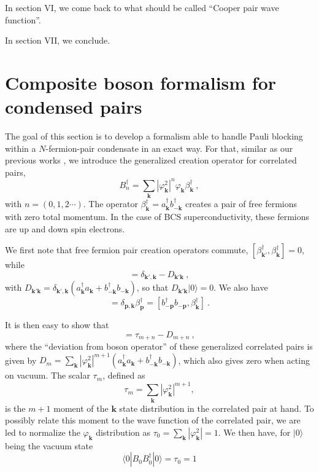 \documentclass[twocolumn,showpacs]{revtex4}
\def\v#1{\mathbf{#1}}
\begin{document}
In section VI, we come back to what should be called ``Cooper pair wave function''.

In section VII, we conclude.

\section{Composite boson formalism for condensed pairs}

The goal of this section is to develop a formalism able to handle Pauli blocking within a $N$-fermion-pair condensate in an exact way. For that, similar as our previous works \cite{CobosonPhysicsReports, combescotBCS, CobosonBcsRich,motheaten}, we introduce the generalized creation operator for correlated pairs,
\begin{equation}
B_n^\dag=\sum_{\v k}|\varphi_{\v k}^2|^n\varphi_{\v k}\beta_{\v k}^\dag\ ,
\end{equation}
with $n=(0,1,2\cdots)$. The operator $\beta_{\v k}^\dag=a_{\v k}^\dag b_{-\v k}^\dag$ creates a pair of free fermions with zero total momentum. In the case of BCS superconductivity, these fermions are up and down spin electrons.

We first note that free fermion pair creation operators commute, $[\beta_{\v k'}^\dag,\beta_{\v k}^\dag]=0$, while
\begin{equation}
[\beta_{\v k'},\beta_{\v k}^\dag]=\delta_{\v k',\v k}-D_{\v k'\v k}\ ,
\end{equation}
with $D_{\v k'\v k}=\delta_{\v k',\v k}(a_{\v k}^\dag a_{\v k}+b_{-\v k}^\dag b_{-\v k})$, so that $D_{\v k'\v k}|0\rangle=0$. We also have
\begin{equation}
[a_{\v p}^\dag a_{\v p},\beta_{\v k}^\dag]=\delta_{\v p,\v k}\beta_{\v p}^\dag=[b_{-\v p}^\dag b_{-\v p},
\beta_{\v k}^\dag]\ .
\end{equation}

It is then easy to show that
\begin{equation}
[B_m,B_n^\dag]=\tau_{m+n}-D_{m+n}\ ,
\end{equation}
where the ``deviation from boson operator'' of these generalized correlated pairs is given by $D_m=\sum_{\v k}|\varphi_{\v k}^2|^{m+1}(a_{\v k}^\dag a_{\v k}+b_{-\v k}^\dag b_{-\v k})$, which also gives zero when acting on vacuum. The scalar $\tau_m$, defined as
\begin{equation}
\tau_m=\sum_{\v k}|\varphi_{\v k}^2|^{m+1},
\end{equation}
is the $m+1$ moment of the $\v k$ state distribution in the correlated pair at hand. To possibly relate this moment to the wave function of the correlated pair, we are led to normalize the $\varphi_{\v k}$ distribution as $\tau_0=\sum_{\v k}|\varphi_{\v k}^2|=1$. We then have, for $|0\rangle$ being the vacuum state
\begin{equation}
\langle0|B_0^{}B_0^{\dag}|0\rangle=\tau_0=1
\end{equation}
\end{document}
